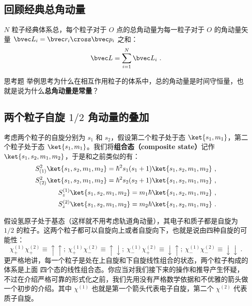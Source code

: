 \subsection{回顾经典总角动量}
$N$ 粒子经典体系总，每个粒子对于 $O$ 点的总角动量为每一粒子对于 $O$ 的角动量矢量 $\bvec L_i=\bvec r_i\cross\bvec p_i$ 之和：
\begin{equation}
\bvec L = \sum_{i=1}^N \bvec L_i~.
\end{equation}
\begin{exercise}{思考题}
举例思考为什么在相互作用粒子的体系中，总的角动量是时间守恒量，也就是说为什么\textbf{总角动量是常量}？
\end{exercise}
\subsection{两个粒子自旋 $1/2$ 角动量的叠加}
考虑两个粒子的自旋分别为 $s_1$ 和 $s_2$，假设第二个粒子处于态 $\ket{s_1,m_1}$，第二个粒子处于态 $\ket{s_1,m_1}$。我们将\textbf{组合态（composite state）}记作 $\ket{s_1,s_2,m_1,m_2}$，于是和之前类似的有：
\begin{align}
S_{(1)}^2\ket{s_1,s_2,m_1,m_2} = \hbar^2 s_1(s_1+1)\ket{s_1,s_2,m_1,m_2}~,\\
S_{(2)}^2\ket{s_1,s_2,m_1,m_2} = \hbar^2 s_2(s_2+1)\ket{s_1,s_2,m_1,m_2}~,\\
S^{(1)}_z\ket{s_1,s_2,m_1,m_2} = m_1\hbar\ket{s_1,s_2,m_1,m_2}~,\\
S^{(2)}_z\ket{s_1,s_2,m_1,m_2} = m_2\hbar\ket{s_1,s_2,m_1,m_2}~.
\end{align}


假设氢原子处于基态（这样就不用考虑轨道角动量），其电子和质子都是自旋为 $1/2$ 的粒子。这两个粒子都可以自旋向上或者自旋向下，也就是说由四种自旋的可能性：
\begin{equation}
\chi^{(1)}_+\chi^{(2)}_+\equiv\uparrow\uparrow;\ \chi^{(1)}_+\chi^{(2)}_-\equiv\uparrow\downarrow;\ \chi^{(1)}_-\chi^{(2)}_+\equiv\downarrow\uparrow;\ \chi^{(1)}_-\chi^{(2)}_-\equiv\downarrow\downarrow~.
\end{equation}
更严格地讲，每一个粒子是处在上自旋和下自旋线性组合的状态，两个粒子构成的体系是上面
四个态的线性组合态。你应当对我们接下来的操作和推导产生怀疑，不过在介绍严格可靠的形式化之前，我们先用没有严格数学依据和不优雅的箭头做一个初步的介绍。其中 $\chi^{(1)}$ 也就是第一个箭头代表电子自旋，第二个 $\chi^{(2)}$ 代表质子自旋。

